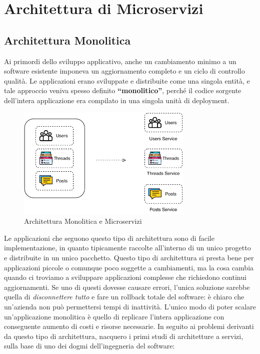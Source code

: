 \section{Architettura di Microservizi}
\subsection{Architettura Monolitica}
Ai primordi dello sviluppo applicativo, anche un cambiamento minimo  a un software esistente imponeva un aggiornamento completo e un ciclo di controllo qualità. Le applicazioni erano sviluppate e distribuite come una singola entità, e tale approccio veniva spesso definito \textbf{“monolitico”}, perché il codice sorgente dell’intera applicazione era compilato in una singola unità di deployment. 

\begin{figure}[H]
    \centering
    \includegraphics[width=0.75\textwidth]{images/01_7_monolithic_vs_microservices.pdf}
    \caption{Architettura Monolitica e Microservizi }
    \label{fig:monolithicvsmicroservices}
\end{figure}

Le applicazioni che seguono questo tipo di architettura sono di facile implementazione, in quanto tipicamente raccolte all'interno di un unico progetto e distribuite in un unico pacchetto. Questo tipo di architettura si presta bene per applicazioni piccole o comunque poco soggette a cambiamenti, ma la cosa cambia quando ci troviamo a sviluppare applicazioni complesse che richiedono continui aggiornamenti. Se uno di questi dovesse causare errori, l'unica soluzione sarebbe quella di \textit{disconnettere tutto} e fare un rollback totale del software: è chiaro che un'azienda non può permettersi tempi di inattività. L’unico modo di poter scalare un’applicazione monolitica è quello di replicare l’intera applicazione con conseguente aumento di costi e risorse necessarie. In seguito ai problemi derivanti da questo tipo di architettura, nacquero i primi studi di architetture a servizi, sulla base di uno dei dogmi dell'ingegneria del software:

